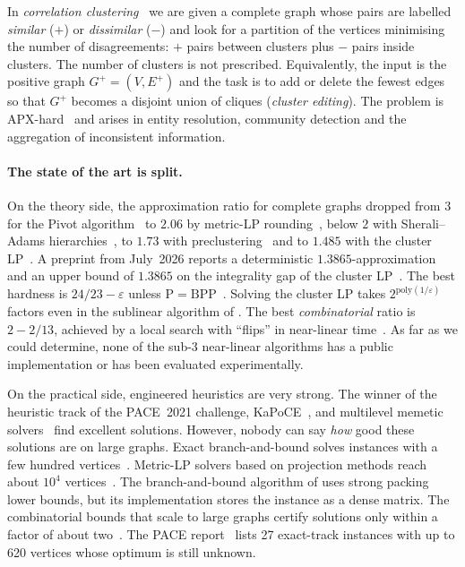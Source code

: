 \documentclass[11pt]{article}
\theoremstyle{definition}
\newcommand{\Ep}{E^{+}}
\begin{document}
In \emph{correlation clustering}~\citep{BansalBC04} we are given a complete
graph whose pairs are labelled \emph{similar} ($+$) or \emph{dissimilar}
($-$) and look for a partition of the vertices minimising the number of
disagreements: $+$ pairs between clusters plus $-$ pairs inside clusters.  The
number of clusters is not prescribed.  Equivalently, the input is the positive
graph $G^+=(V,\Ep)$ and the task is to add or delete the fewest edges so that
$G^+$ becomes a disjoint union of cliques (\emph{cluster editing}).  The
problem is APX-hard~\citep{CharikarGW05} and arises in entity resolution,
community detection and the aggregation of inconsistent information.

\paragraph{The state of the art is split.}  On the theory side, the
approximation ratio for complete graphs dropped from $3$ for the Pivot
algorithm~\citep{AilonCN08} to $2.06$ by metric-LP
rounding~\citep{ChawlaMSY15}, below $2$ with Sherali--Adams
hierarchies~\citep{CohenAddadLN22}, to $1.73$ with
preclustering~\citep{CohenAddadLLN23} and to $1.485$ with the cluster
LP~\citep{CaoCLLNV24}.  A preprint from July~2026 reports a deterministic
$1.3865$-approximation and an upper bound of $1.3865$ on the integrality gap
of the cluster LP~\citep{GarciaSorianoS26}.  The best hardness is
$24/23-\varepsilon$ unless $\mathrm{P}=\mathrm{BPP}$~\citep{CaoCLLNV24}.
Solving the cluster LP takes $2^{\mathrm{poly}(1/\varepsilon)}$ factors even in
the sublinear algorithm of \citet{CaoCLLLNTVYZ25}.  The best
\emph{combinatorial} ratio is $2-2/13$, achieved by a local search with
``flips'' in near-linear time~\citep{CohenAddadLPTYZ24}.  As far as we could
determine, none of the sub-$3$ near-linear algorithms has a public
implementation or has been evaluated experimentally.

On the practical side, engineered heuristics are very strong.  The winner of the
heuristic track of the PACE~2021 challenge, KaPoCE~\citep{BlasiusEtAl21kapoceHeur},
and multilevel memetic solvers~\citep{hausberger2025scc} find excellent
solutions.  However, nobody can say \emph{how} good these solutions are on
large graphs.  Exact branch-and-bound solves instances with a few hundred
vertices~\citep{BlasiusEtAl22sea}.  Metric-LP solvers based on projection
methods reach about $10^4$ vertices~\citep{veldt2019metric,ruggles2020parallel}.
The branch-and-bound algorithm of \citet{BlasiusEtAl22sea} uses strong
packing lower bounds, but its implementation stores the instance as a dense
matrix.  The combinatorial bounds that scale to large graphs certify
solutions only within a factor of about two~\citep{veldt2022stc}.  The PACE report~\citep{KellerhalsKNZ21pace}
lists 27 exact-track instances with up to 620 vertices whose optimum is
still unknown.
\end{document}
